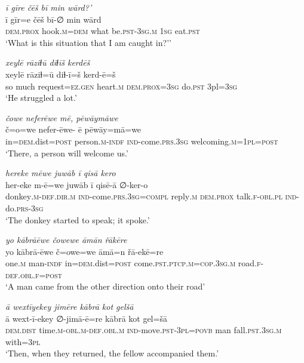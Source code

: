 \ea \label{HB.23}
\textit{ī gīre čēš bī min wārd?’} \\ 
\gll ī gīr=e čēš bī-∅ min wārd \\ 
 \textsc{dem.prox} hook\textsc{.m}\textsc{=dem} what be\textsc{.pst}\textsc{-3sg}\textsc{.m} \textsc{1sg} eat\textsc{.pst} \\ 
\glt `What is this situation that I am caught in?’'
\z 
 
\ea \label{HB.28}
\textit{xeylē rāziɫū diɫīš kerdēš} \\ 
\gll xeylē rāziɫ=ū diɫ-ī=š kerd-ē=š \\ 
 so much request\textsc{=ez}\textsc{.gen} heart\textsc{.m} \textsc{dem.prox}\textsc{=3sg} do\textsc{.pst} 3pl\textsc{=3sg} \\ 
\glt `He struggled a lot.'
\z 
 
\ea \label{HB.34}
\textit{čowe neferēwe mē, pēwāymāwe} \\ 
\gll č=o=we nefer-ēwe- ē pēwāy=mā=we \\ 
 in\textsc{=dem}.dist\textsc{=\textsc{post}} person\textsc{.m}\textsc{-indf} \textsc{ind-}come\textsc{.prs}\textsc{.3sg} welcoming\textsc{.m}\textsc{=1pl}\textsc{=\textsc{post}} \\ 
\glt `There, a person will welcome us.'
\z 
 
\ea \label{HB.44}
\textit{hereke mēwe juwāb ī qisā kero} \\ 
\gll her-eke m-ē=we juwāb ī qisē-ā ∅-ker-o \\ 
 donkey\textsc{.m}\textsc{-def}\textsc{.dir}\textsc{.m} \textsc{ind-}come\textsc{.prs}\textsc{.3sg}\textsc{=compl} reply\textsc{.m} \textsc{dem.prox} talk\textsc{\textsc{.f}}\textsc{-obl}\textsc{.pl} \textsc{ind-}do\textsc{.prs}\textsc{-3sg} \\ 
\glt `The donkey started to speak; it spoke.'
\z 
 
\ea \label{HB.49}
\textit{yo kābrāēwe čowewe āmān řākēre} \\ 
\gll yo kābrā-ēwe č=owe=we āmā=n řā-ekē=re \\ 
 one\textsc{.m} man\textsc{-indf} in\textsc{=dem}.dist\textsc{=\textsc{post}} come\textsc{.pst}\textsc{.ptcp}\textsc{.m}\textsc{=cop}\textsc{.3sg}\textsc{.m} road\textsc{\textsc{.f}}\textsc{-def}\textsc{.obl}\textsc{\textsc{.f}}\textsc{=\textsc{post}} \\ 
\glt `A man came from the other direction onto their road'
\z 
 
\ea \label{HB.59}
\textit{ā wextīyekey jimēre kābrā kot gelšā} \\ 
\gll ā wext-ī-ekey ∅-jimā-ē=re kābrā kot gel=šā \\ 
 \textsc{dem.dist} time\textsc{.m}\textsc{-obl}\textsc{.m}\textsc{-def}\textsc{.obl}\textsc{.m} \textsc{ind-}move\textsc{.pst}\textsc{-3pl}\textsc{=\textsc{povb}} man fall\textsc{.pst}\textsc{.3sg}\textsc{.m} with\textsc{=3pl} \\ 
\glt `Then, when they returned, the fellow accompanied them.'
\z 
 
